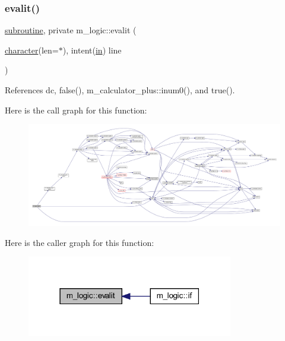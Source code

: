 \subsubsection{\texorpdfstring{evalit()}{evalit()}}
{\footnotesize\ttfamily \hyperlink{M__stopwatch_83_8txt_acfbcff50169d691ff02d4a123ed70482}{subroutine}, private m\+\_\+logic\+::evalit (\begin{DoxyParamCaption}\item[{\hyperlink{option__stopwatch_83_8txt_abd4b21fbbd175834027b5224bfe97e66}{character}(len=$\ast$), intent(\hyperlink{M__journal_83_8txt_afce72651d1eed785a2132bee863b2f38}{in})}]{line }\end{DoxyParamCaption})\hspace{0.3cm}{\ttfamily [private]}}



References dc, false(), m\+\_\+calculator\+\_\+plus\+::inum0(), and true().

Here is the call graph for this function\+:
\nopagebreak
\begin{figure}[H]
\begin{center}
\leavevmode
\includegraphics[width=350pt]{namespacem__logic_aa03730fb0581290fa8c776b633430584_cgraph}
\end{center}
\end{figure}
Here is the caller graph for this function\+:
\nopagebreak
\begin{figure}[H]
\begin{center}
\leavevmode
\includegraphics[width=255pt]{namespacem__logic_aa03730fb0581290fa8c776b633430584_icgraph}
\end{center}
\end{figure}
\mbox{\label{namespacem__logic_a2229d0129ded7d8a34fce60334bc5938}} 
